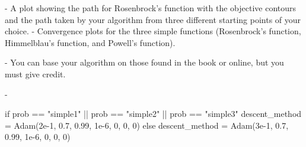 \documentclass[conference]{IEEEtran}
\begin{document}
- A plot showing the path for Rosenbrock’s function with the objective contours and the path taken by your algorithm from three different starting points of your choice.
- Convergence plots for the three simple functions (Rosenbrock’s function, Himmelblau’s function, and Powell’s function).

- You can base your algorithm on those found in the book or online, but you must give credit.

- 

if prob == "simple1" || prob == "simple2" || prob == "simple3"
        descent\_method = Adam(2e-1, 0.7, 0.99, 1e-6, 0, 0, 0)
    else
        descent_method = Adam(3e-1, 0.7, 0.99, 1e-6, 0, 0, 0)
\end{document}
